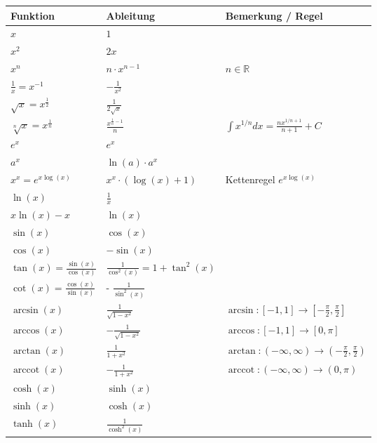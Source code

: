 \documentclass{sciposter}
\newcommand{\R}{\mathbb{R}}
\begin{document}
\begin{multicols}{2}
\vfill\null
\columnbreak


{\renewcommand{\arraystretch}{1.5}
	\begin{table}[]
		\begin{tabular}{@{} p{} p{} p{} @{}}
			\toprule
			Funktion & Ableitung & Bemerkung / Regel\\ \midrule
			$x$ & $1$ &   \\
			$x^2$& $2x$ &   \\
			$x^n$& $n\cdot x^{n-1}$ & $n \in \R$  \\
			$\frac{1}{x} = x^{-1}$ & $- \frac{1}{x^2}$ & \\
			$\sqrt{x} = x^{\frac{1}{2}}$ & $\frac{1}{2\sqrt{x}}$ & \\ 
			$\sqrt[n]{x} = x^{\frac{1}{n}}$ & $\frac{x^{\frac{1}{n} -1 }}{n}$ &  $\int x^{1/n} dx = \frac{n x^{1/n + 1}}{n+1} + C$\\ 
			$e^x$ & $e^x$ & \\
			$a^x$ & $\ln(a) \cdot a^x$& \\
			$x^x = e^{x\log(x)}$ & $x^x \cdot (\log(x) + 1)$ & Kettenregel $e^{x\log(x)}$\\
			$\ln(x)$ & $\frac{1}{x}$ & \\
			$x\ln(x) - x$ & $\ln(x)$ &  \\ \midrule
			$\sin(x)$ & $\cos(x)$ & \\
			$\cos(x)$ & $- \sin(x)$ & \\ 
			$\tan(x) = \frac{\sin(x)}{\cos(x)}$ & $\frac{1}{\cos^2(x)} = 1 + \tan^2(x)$ &\\
			$\cot(x) = \frac{\cos(x)}{\sin(x)}$ & - $\frac{1}{\sin^2(x)}$ & \\ 
			$\arcsin(x)$ & $\frac{1}{\sqrt{1 - x^2}}$ & $ \arcsin : [-1,1] \to [-\frac{\pi}{2},\frac{\pi}{2}]$\\
			$\arccos(x)$ & $ - \frac{1}{\sqrt{1-x^2}}$ & $\arccos : [-1,1] \to [0, \pi]$\\
			$\arctan(x)$ & $\frac{1}{1+x^2}$ & $\arctan:(-\infty, \infty) \to (- \frac{\pi}{2},\frac{\pi}{2})$\\
			$\operatorname{arccot}(x)$ & $ - \frac{1}{1+x^2} $ & $\operatorname{arccot} : (-\infty, \infty) \to (0,\pi)$\\
			\midrule
			$\cosh(x)$ & $\sinh(x)$ &\\
			$\sinh(x)$ & $\cosh(x)$ & \\
			$\tanh(x)$ & $\frac{1}{\cosh^2(x)}$ & \\

\end{tabular}
\end{table}}
\end{multicols}
\end{document}

